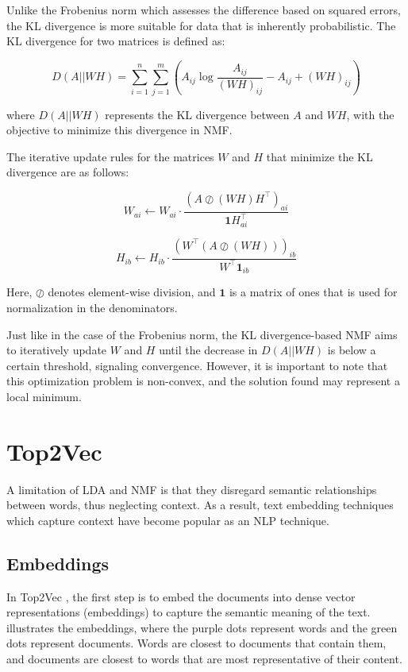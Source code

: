 Unlike the Frobenius norm which assesses the difference based on squared errors, the KL divergence is more suitable for data that is inherently probabilistic. The KL divergence for two matrices is defined as:

\[
    D(A || WH) = \sum_{i=1}^{n} \sum_{j=1}^{m} \left( A_{ij} \log\frac{A_{ij}}{(WH)_{ij}} - A_{ij} + (WH)_{ij} \right)
\]

where \( D(A || WH) \) represents the KL divergence between \( A \) and \( WH \), with the objective to minimize this divergence in NMF.

The iterative update rules for the matrices \( W \) and \( H \) that minimize the KL divergence are as follows:

\[
    W_{ai} \leftarrow W_{ai} \cdot \frac{(A \oslash (WH)H^\top)_{ai}}{\mathbf{1}H^\top_{ai}}
\]

\[
    H_{ib} \leftarrow H_{ib} \cdot \frac{(W^\top(A \oslash (WH)))_{ib}}{W^\top\mathbf{1}_{ib}}
\]

Here, \( \oslash \) denotes element-wise division, and \( \mathbf{1} \) is a matrix of ones that is used for normalization in the denominators.

Just like in the case of the Frobenius norm, the KL divergence-based NMF aims to iteratively update \( W \) and \( H \) until the decrease in \( D(A || WH) \) is below a certain threshold, signaling convergence. However, it is important to note that this optimization problem is non-convex, and the solution found may represent a local minimum.

\section{Top2Vec}
\label{sec:top2vec}
A limitation of LDA and NMF is that they disregard semantic relationships between words, thus neglecting context. As a result, text embedding techniques which capture context have become popular as an NLP technique.

\subsection{Embeddings}

In Top2Vec \cite{angelov_top2vec_2020}, the first step is to embed the documents into dense vector representations (embeddings) to capture the semantic meaning of the text.  \cite{angelov_top2vec_2020} illustrates the embeddings, where the purple dots represent words and the green dots represent documents. Words are closest to documents that contain them, and documents are closest to words that are most representative of their content.

